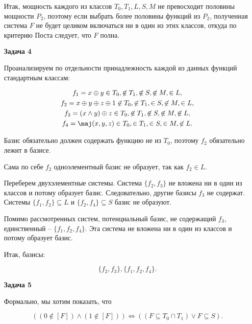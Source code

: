 		Итак, мощность каждого из классов $T_0, T_1, L, S, M$ не превосходит половины мощности $P_2$, поэтому если выбрать более половины функций из $P_2$, полученная система $F$ не будет целиком включаться ни в один из этих классов, откуда по критерию Поста следует, что $F$ полна.


	\begin{center}
    \textbf{Задача 4}
\end{center}
		Проанализируем по отдельности принадлежность каждой из данных функций стандартным классам:

		\begin{gather*}
			f_1 = x \oplus y \in T_0, \not\in T_1, \not\in S, \not\in M, \in L, \\
			f_2 = x \oplus y \oplus z \oplus 1 \not\in T_0, \not\in T_1, \in S, \not\in M, \in L, \\
			f_3 = (x \land y) \oplus z \in T_0, \not\in T_1, \not\in S, \not\in M, \not\in L, \\
			f_4 = \maj(x, y, z) \in T_0, \in T_1, \in S, \in M, \not\in L.
		\end{gather*}

		Базис обязательно должен содержать функцию не из $T_0$, поэтому $f_2$ обязательно лежит в базисе.

		Сама по себе $f_2$ одноэлементный базис не образует, так как $f_2 \in L$.

		Переберем двухэлементные системы. Система $\{f_2, f_3\}$ не вложена ни в один из классов и потому образует базис. Следовательно, другие базисы $f_3$ не содержат. Системы $\{f_1, f_2\} \subseteq L$ и $\{f_2, f_4\} \subseteq S$ базис не образуют.

		Помимо рассмотренных систем, потенциальный базис, не содержащий $f_3$, единственный -- $\{f_1, f_2, f_4\}$. Эта система не вложена ни в один из классов и потому образует базис.

		Итак, базисы:

		\begin{equation*}
			\{f_2, f_3\}, \{f_1, f_2, f_4\}.
		\end{equation*}


	\begin{center}
    \textbf{Задача 5}
\end{center}
		Формально, мы хотим показать, что

		\begin{equation*}
			((0 \not\in [F]) \land (1 \not\in [F])) \Longleftrightarrow ((F \subseteq T_0 \cap T_1) \lor F \subseteq S).
		\end{equation*}

